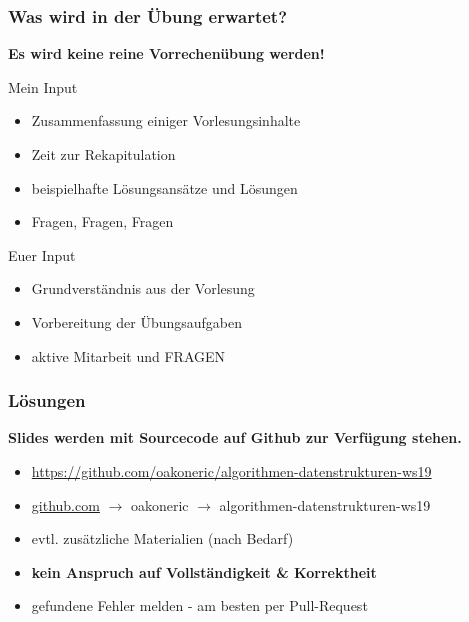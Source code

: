 \documentclass{beamer}
\begin{document}
	\begin{frame} \frametitle{Was wird in der Übung erwartet?}
		\begin{center}
			\bfseries
			Es wird keine reine Vorrechenübung werden!
		\end{center}
		
		\pause
		
		\begin{block}{Mein Input}
			\begin{itemize}[leftmargin=2em, nolistsep]
				\item Zusammenfassung einiger Vorlesungsinhalte
				\item Zeit zur Rekapitulation
				\item beispielhafte Lösungsansätze und Lösungen
				\item Fragen, Fragen, Fragen
			\end{itemize}
		\end{block}
	
		\pause
		\begin{block}{Euer Input}
			\begin{itemize}[leftmargin=2em, nolistsep]
				\item Grundverständnis aus der Vorlesung
				\item Vorbereitung der Übungsaufgaben
				\item aktive Mitarbeit und FRAGEN
			\end{itemize}
		\end{block}
	\end{frame}

	\begin{frame} \frametitle{Lösungen}
		\textbf{Slides werden mit Sourcecode auf Github zur Verfügung stehen.}
		\begin{itemize}[leftmargin=*]
			\item \url{https://github.com/oakoneric/algorithmen-datenstrukturen-ws19}
			\item \url{github.com} $\to$ oakoneric $\to$ algorithmen-datenstrukturen-ws19
			\item evtl. zusätzliche Materialien (nach Bedarf)
			\item \alert{\textbf{kein Anspruch auf Vollständigkeit \& Korrektheit}}
			\item gefundene Fehler melden - am besten per Pull-Request
		\end{itemize}
	\end{frame}

\end{document}
